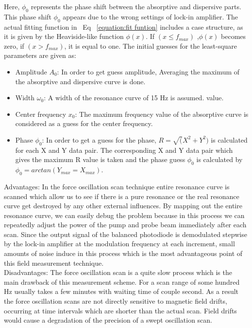 Here, $\phi_0 $ represents the phase shift between the absorptive and dispersive parts. This phase shift $\phi_0$ appears due to the wrong settings of lock-in amplifier. The actual fitting function in~ Eq~ \ref{equation:fit funtion} includes a case
structure, as it is given by the Heaviside-like function $\phi(x)$. If $ (x \leq f_{max}) $ ,$\phi(x)$ becomes zero,
if $(x > f_{max})$, it is equal to one. The initial guesses for the least-square parameters are given
as:\\
\begin{itemize}
\item
Amplitude $A_0$: In order to get guess amplitude, Averaging the maximum of the absorptive and dispersive curve is done.
\item
Width $\omega_0$: A width of the resonance curve of 15 Hz is assumed.
value.
\item
Center frequency $x_0$: The maximum frequency value of the
absorptive curve is considered as a guess for the center frequency.
\item
Phase $\phi_0$: In order to get a guess for the phase, $ R =\sqrt (
X^2 + Y ^2)$ is calculated for each
X and Y data pair. The corresponding X and Y data pair which gives the maximum
R value is taken and the phase guess $\phi _0$  is calculated by $\phi _0 = arctan(Y_{max}=X_{max})$.
\end{itemize}
Advantages: In the force oscillation scan technique entire resonance curve is scanned which allow us to see if there is a pure resonance or the real resonance curve get destroyed by any other external influences. By mapping out the entire resonance curve, we can easily debug the problem because in this process we can repeatedly adjust the power of the pump and probe beam immediately after each scan. Since the output signal of the balanced photodiode is demodulated stepwise by the lock-in amplifier at the modulation frequency at each increment, small amounts of noise induce in this process which is the most advantageous point of this field measurement technique. \\
Disadvantages: The force oscillation scan is a quite slow process which is the main drawback of this measurement scheme.
For a scan range of some hundred Hz usually takes a few minutes with  waiting time of couple second. As a result the force oscillation scans are not directly sensitive to magnetic field drifts, occurring at time intervals which are shorter than the actual scan. Field drifts would cause a degradation of the precision of a swept oscillation scan.
